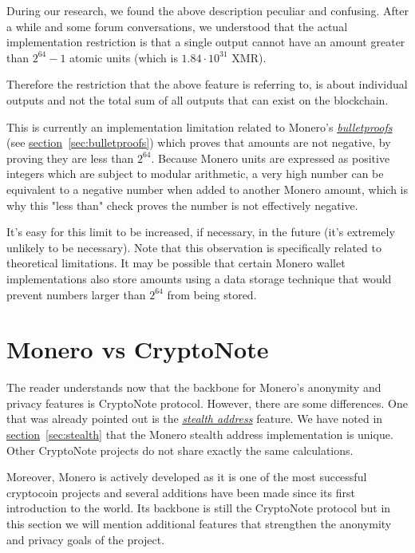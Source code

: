 During our research, we found the above description peculiar and confusing. After a while and some forum conversations, we understood that the actual implementation restriction is that a single output cannot have an amount greater than $2^{64} − 1$ atomic units (which is $1.84 \cdot 10^{31}$ XMR).

Therefore the restriction that the above feature is referring to, is about individual outputs and not the total sum of all outputs that can exist on the blockchain.
\vspace{0.2cm}

This is currently an implementation limitation related to Monero's \hyperref[sec:bulletproofs]{\emph{bulletproofs}}~\cite{getmonero} (see \hyperref[sec:bulletproofs]{section}~\ref{sec:bulletproofs}) which proves that amounts are not negative, by proving they are less than $2^{64}$. Because Monero units are expressed as positive integers which are subject to modular arithmetic, a very high number can be equivalent to a negative number when added to another Monero amount, which is why this "less than" check proves the number is not effectively negative.

It's easy for this limit to be increased, if necessary, in the future (it's extremely unlikely to be necessary). Note that this observation is specifically related to theoretical limitations. It may be possible that certain Monero wallet implementations also store amounts using a data storage technique that would prevent numbers larger than $2^{64}$ from being stored.
\clearpage
\pagebreak

\section{Monero vs CryptoNote}
The reader understands now that the backbone for Monero's anonymity and privacy features is CryptoNote protocol. However, there are some differences. One that was already pointed out is the \hyperref[sec:stealth]{\emph{stealth address}} feature. We have noted in \hyperref[sec:stealth]{section}~\ref{sec:stealth} that the Monero stealth address implementation is unique. Other CryptoNote projects do not share exactly the same calculations.

Moreover, Monero is actively developed as it is one of the most successful cryptocoin projects and several additions have been made since its first introduction to the world. Its backbone is still the CryptoNote protocol but in this section we will mention additional features that strengthen the anonymity and privacy goals of the project.

